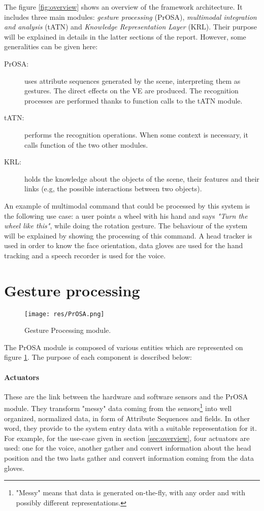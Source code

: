 \documentclass[a4paper]{article}
\begin{document}
The figure \ref{fig:overview} shows an overview of the framework architecture. It includes three main modules: \textit{gesture processing} (PrOSA), \textit{multimodal integration and analysis} (tATN) and \textit{Knowledge Representation Layer} (KRL). Their purpose will be explained in details in the latter sections of the report. However, some generalities can be given here:
\begin{description}
	\item[PrOSA:] uses attribute sequences generated by the scene, interpreting them as gestures. The direct effects on the VE are produced. The recognition processes are performed thanks to function calls to the tATN module.
	\item[tATN:] performs the recognition operations. When some context is necessary, it calls function of the two other modules.
	\item[KRL:] holds the knowledge about the objects of the scene, their features and their links (e.g, the possible interactions between two objects).
\end{description}

An example of multimodal command that could be processed by this system is the following use case: a user points a wheel with his hand and says \textit{"Turn the wheel like this"}, while doing the rotation gesture. The behaviour of the system will be explained by showing the processing of this command. A head tracker is used in order to know the face orientation, data gloves are used for the hand tracking and a speech recorder is used for the voice.

\section{Gesture processing}

\begin{figure}
\centering
\texttt{[image: res/PrOSA.png]}
\caption{\label{fig:PrOSA}Gesture Processing module.}
\end{figure}

The PrOSA module is composed of various entities which are represented on figure \ref{fig:PrOSA}. The purpose of each component is described below:

\paragraph{Actuators} These are the link between the hardware and software sensors and the PrOSA module. They transform "messy" data coming from the sensors\footnote{"Messy" means that data is generated on-the-fly, with any order and with possibly different representations.} into well organized, normalized data, in form of Attribute Sequences and fields. In other word, they provide to the system entry data with a suitable representation for it. For example, for the use-case given in section \ref{sec:overview}, four actuators are used: one for the voice, another gather and convert information about the head position and the two lasts gather and convert information coming from the data gloves.
\end{document}
